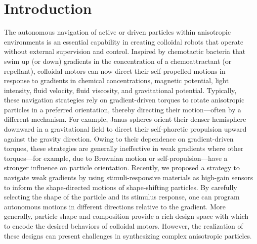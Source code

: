 \section{Introduction}
The autonomous navigation of active or driven particles within anisotropic environments is an essential capability in creating colloidal robots\autocite{palagi2018bioinspired,han2018engineering} that operate without external supervision and control. Inspired by chemotactic bacteria that swim up (or down) gradients in the concentration of a chemoattractant (or repellant), colloidal motors can now direct their self-propelled motions in response to gradients in chemical concentrations,\autocite{hong2007chemotaxis} magnetic potential,\autocite{Kline2005} light intensity,\autocite{dai2016programmable,lozano2016phototaxis} fluid velocity,\autocite{Palacci2015,ren2017rheotaxis} fluid viscosity,\autocite{liebchen2018viscotaxis} and gravitational potential.\autocite{campbell2013gravitaxis,ten2014gravitaxis} Typically, these navigation strategies rely on gradient-driven torques to rotate anisotropic particles in a preferred orientation, thereby directing their motion---often by a different mechanism. For example, Janus spheres orient their denser hemisphere downward in a gravitational field to direct their self-phoretic propulsion upward against the gravity direction.\autocite{campbell2013gravitaxis} Owing to their dependence on gradient-driven torques, these strategies are generally ineffective in weak gradients where other torques---for example, due to Brownian motion or self-propulsion---have a stronger influence on particle orientation.  Recently, we proposed a strategy to navigate weak gradients by using stimuli-responsive materials as high-gain sensors to inform the shape-directed motions of shape-shifting particles.\autocite{dou2019autonomous} By carefully selecting the shape of the particle and its stimulus response, one can program autonomous motions in different directions relative to the gradient. More generally, particle shape\autocite{brooks2018shape,sabrina2018shape,brooks2019shape} and composition\autocite{lee2019directed} provide a rich design space with which to encode the desired behaviors of colloidal motors. However, the realization of these designs can present challenges in synthesizing complex anisotropic particles.
 
